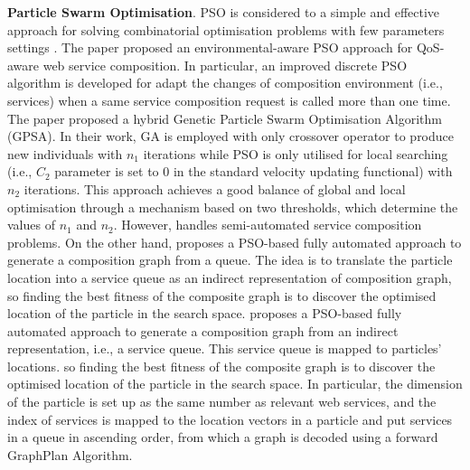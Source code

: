 \textbf{Particle Swarm Optimisation}.
PSO is considered to a simple and effective approach for solving combinatorial optimisation problems with few parameters settings \cite{long2009environment}. The paper \cite{long2009environment} proposed an environmental-aware PSO approach for QoS-aware web service composition. In particular, an improved discrete PSO algorithm is developed for adapt the changes of composition environment (i.e., services) when a same service composition request is called more than one time. The paper \cite{liu2007hybrid} proposed a hybrid Genetic Particle Swarm Optimisation Algorithm (GPSA). In their work, GA is employed with only crossover operator to produce new individuals with $n_1$ iterations while PSO is only utilised for local searching (i.e., $C_2$ parameter is set to 0 in the standard velocity updating functional) with $n_2$ iterations. This approach achieves a good balance of global and local optimisation through a  mechanism based on two thresholds, which determine the values of $n_1$ and $n_2$. However, \cite{liu2007hybrid,long2009environment} handles semi-automated service composition problems. On the other hand, \cite{da2016particle} proposes a PSO-based fully automated approach to generate a composition graph from a queue. The idea is to translate the particle location into a service queue as an indirect representation of composition  graph, so finding the best fitness of the composite graph is to discover the optimised location of the particle in the search space. \cite{da2016particle} proposes a PSO-based fully automated approach to generate a composition graph from an indirect representation, i.e., a service queue. This service queue is mapped to particles' locations.  so finding the best fitness of the composite graph is to discover the optimised location of the particle in the search space. In particular,  the dimension of the particle is set up as the same number as relevant web services, and the index of services is mapped to the location vectors in a particle and put services in a queue in ascending order, from which a graph is decoded using a forward GraphPlan Algorithm. 

